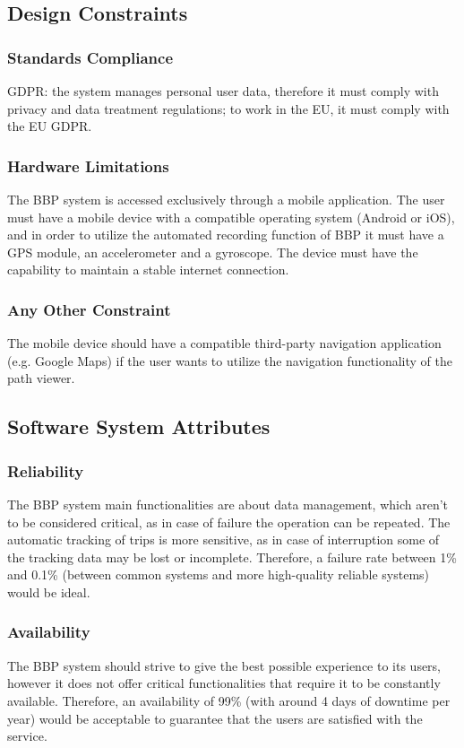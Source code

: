 \subsection{Design Constraints}
\subsubsection{Standards Compliance}
GDPR: the system manages personal user data, therefore it must comply with privacy and 
data treatment regulations; to work in the EU, it must comply with the EU GDPR.

\subsubsection{Hardware Limitations}
The BBP system is accessed exclusively through a mobile application. The user must have 
a mobile device with a compatible operating system (Android or iOS), and in order to utilize 
the automated recording function of BBP it must have a GPS module, an accelerometer and 
a gyroscope. The device must have the capability to maintain a stable internet connection.

\subsubsection{Any Other Constraint}
The mobile device should have a compatible third-party navigation application (e.g. Google 
Maps) if the user wants to utilize the navigation functionality of the path viewer.

\subsection{Software System Attributes}

\subsubsection{Reliability}
The BBP system main functionalities are about data management, which aren’t to be 
considered critical, as in case of failure the operation can be repeated. The automatic 
tracking of trips is more sensitive, as in case of interruption some of the tracking 
data may be lost or incomplete. Therefore, a failure rate between 1\% and 0.1\% 
(between common systems and more high-quality reliable systems) would be ideal.

\subsubsection{Availability}
The BBP system should strive to give the best possible experience to its users, 
however it does not offer critical functionalities that require it to be constantly 
available. Therefore, an availability of 99\% (with around 4 days of downtime per 
year) would be acceptable to guarantee that the users are satisfied with the service.

